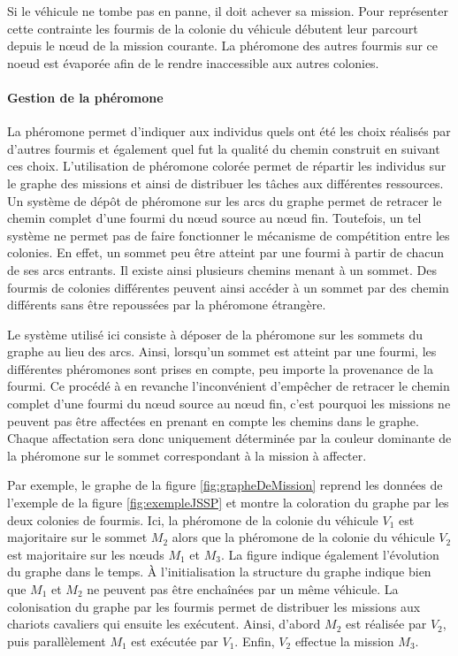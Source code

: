 Si le véhicule ne tombe pas en panne, il doit achever sa mission. Pour représenter cette contrainte les fourmis de la colonie du véhicule débutent leur parcourt depuis le n\oe{}ud de la mission courante. La phéromone des autres fourmis sur ce noeud est évaporée afin de le rendre inaccessible aux autres colonies.

\paragraph{Gestion de la phéromone}

La phéromone permet d'indiquer aux individus quels ont été les choix réalisés par d'autres fourmis et également quel fut la qualité du chemin construit en suivant ces choix. L'utilisation de phéromone colorée permet de répartir les individus sur le graphe des missions et ainsi de distribuer les tâches aux différentes ressources. 
Un système de dépôt de phéromone sur les arcs du graphe permet de retracer le chemin complet d'une fourmi du n\oe{}ud source au n\oe{}ud fin. Toutefois, un tel système ne permet pas de faire fonctionner le mécanisme de compétition entre les colonies.
En effet, un sommet peu être atteint par une fourmi à partir de chacun de ses arcs entrants. Il existe ainsi plusieurs chemins menant à un sommet. Des fourmis de colonies différentes peuvent ainsi accéder à un sommet par des chemin différents sans être repoussées par la phéromone étrangère.

Le système utilisé ici consiste à déposer de la phéromone sur les sommets du graphe au lieu des arcs. Ainsi, lorsqu'un sommet est atteint par une fourmi, les différentes phéromones sont prises en compte, peu importe la provenance de la fourmi. Ce procédé à en revanche l'inconvénient d'empêcher de retracer le chemin complet d'une fourmi du n\oe{}ud source au n\oe{}ud fin, c'est pourquoi les missions ne peuvent pas être affectées en prenant en compte les chemins dans le graphe.
Chaque affectation sera donc uniquement déterminée par la couleur dominante de la phéromone sur le sommet correspondant à la mission à affecter.

Par exemple, le graphe de la figure \ref{fig:grapheDeMission} reprend les données de l'exemple de la figure \ref{fig:exempleJSSP} et montre la coloration du graphe par les deux colonies de fourmis. Ici, la phéromone de la colonie du véhicule $V_1$ est majoritaire sur le sommet $M_2$ alors que la phéromone de la colonie du véhicule $V_2$ est majoritaire sur les n\oe{}uds $M_1$ et $M_3$. La figure indique également l'évolution du graphe dans le temps. À l'initialisation la structure du graphe indique bien que $M_1$ et $M_2$ ne peuvent pas être enchaînées par un même véhicule. La colonisation du graphe par les fourmis permet de distribuer les missions aux chariots cavaliers qui ensuite les exécutent. Ainsi, d'abord $M_2$ est réalisée par $V_2$, puis parallèlement $M_1$ est exécutée par $V_1$. Enfin, $V_2$ effectue la mission $M_3$.

